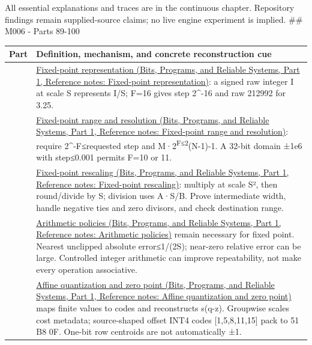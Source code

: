 All essential explanations and traces are in the continuous chapter. Repository findings remain supplied-source claims; no live engine experiment is implied. \#\# M006 - Parts 89-100

{\def\LTcaptype{none} %
\begin{longtable}[]{@{}
  >{\raggedright\arraybackslash}p{}
  >{\raggedright\arraybackslash}p{}@{}}
\toprule\noalign{}
\begin{minipage}[b]{\linewidth}\raggedright
Part
\end{minipage} & \begin{minipage}[b]{\linewidth}\raggedright
Definition, mechanism, and concrete reconstruction cue
\end{minipage} \\
\midrule\noalign{}
\endhead
\bottomrule\noalign{}
\endlastfoot
89 & \href{../01-Bits-Programs-and-Reliable-Systems-P01/main.pdf\#nameddest=appendix-1d0dbe8924cc}{Fixed-point representation (Bits, Programs, and Reliable Systems, Part 1, Reference notes: Fixed-point representation)}: a signed raw integer I at scale S represents I/S; F=16 gives step 2\^{}-16 and raw 212992 for 3.25. \\
90 & \href{../01-Bits-Programs-and-Reliable-Systems-P01/main.pdf\#nameddest=appendix-ceb4c4a9b5a1}{Fixed-point range and resolution (Bits, Programs, and Reliable Systems, Part 1, Reference notes: Fixed-point range and resolution)}: require 2\^{}-F≤requested step and M·2\textsuperscript{F≤2}(N-1)-1. A 32-bit domain ±1e6 with step≤0.001 permits F=10 or 11. \\
91 & \href{../01-Bits-Programs-and-Reliable-Systems-P01/main.pdf\#nameddest=appendix-3333db47830f}{Fixed-point rescaling (Bits, Programs, and Reliable Systems, Part 1, Reference notes: Fixed-point rescaling)}: multiply at scale S², then round/divide by S; division uses A·S/B. Prove intermediate width, handle negative ties and zero divisors, and check destination range. \\
92 & \href{../01-Bits-Programs-and-Reliable-Systems-P01/main.pdf\#nameddest=appendix-2ed044358b82}{Arithmetic policies (Bits, Programs, and Reliable Systems, Part 1, Reference notes: Arithmetic policies)} remain necessary for fixed point. Nearest unclipped absolute error≤1/(2S); near-zero relative error can be large. Controlled integer arithmetic can improve repeatability, not make every operation associative. \\
93 & \href{../01-Bits-Programs-and-Reliable-Systems-P01/main.pdf\#nameddest=appendix-d5da3eaabaef}{Affine quantization and zero point (Bits, Programs, and Reliable Systems, Part 1, Reference notes: Affine quantization and zero point)} maps finite values to codes and reconstructs s(q-z). Groupwise scales cost metadata; source-shaped offset INT4 codes {[}1,5,8,11,15{]} pack to 51 B8 0F. One-bit row centroids are not automatically ±1. \\

\end{longtable}}
